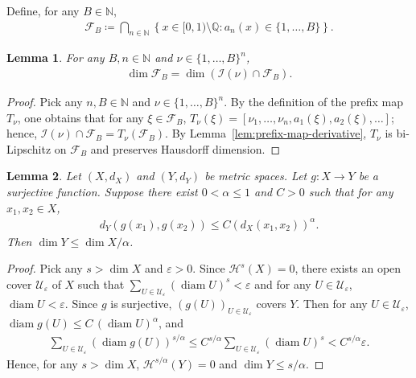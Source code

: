 \documentclass[12pt,reqno]{amsart}
\theoremstyle{definition}
\theoremstyle{plain}
\newtheorem{lemma}{Lemma}
\DeclareMathOperator{\diam}{diam}
\begin{document}
Define, for any $B\in\mathbb{N}$, 
\begin{align*}
    \mathcal{F}_B
    \coloneqq
    \bigcap_{n\in\mathbb{N}}
    \left\{x\in[0,1)\setminus\mathbb{Q}: a_n(x)\in\{1,\ldots,B\}\right\}.
\end{align*}
\begin{lemma}
\label{lem:bounded-prefix-dimension}
For any $B,n\in\mathbb{N}$ and $\nu\in\{1,\dots,B\}^n$,
\begin{align*}
    \dim{\mathcal{F}_B}
    =\dim{\left(\mathcal{I}(\nu)\cap\mathcal{F}_B\right)}.
\end{align*}
\end{lemma}
\begin{proof}
Pick any $n,B\in\mathbb{N}$ and $\nu\in\{1,\dots,B\}^n$. 
By the definition of the prefix map $T_\nu$, one obtains that for any $\xi\in{\mathcal{F}_B}$, $T_\nu(\xi)=[\nu_1,\ldots,\nu_n,a_1(\xi),a_2(\xi),\ldots]$; hence, $\mathcal{I}(\nu)\cap \mathcal{F}_B=T_\nu(\mathcal{F}_B)$. By Lemma~\ref{lem:prefix-map-derivative}, $T_\nu$ is bi-Lipschitz on $\mathcal{F}_B$ and preserves Hausdorff dimension.
\end{proof}

\begin{lemma}
\label{lem:holder-dimension-estimate}
Let $(X,d_X)$ and $(Y,d_Y)$ be metric spaces. Let $g:X\to Y$ be a surjective function. Suppose there exist $0<\alpha\leq 1$ and $C>0$ such that for any $x_1,x_2\in X$,
\begin{align*}
    d_Y(g(x_1),g(x_2))\leq C \left(d_X(x_1,x_2)\right)^\alpha.
\end{align*}
Then $\dim{Y}\leq\dim{X}/\alpha$.
\end{lemma}
\begin{proof}
Pick any $s>\dim{X}$ and $\varepsilon>0$. Since $\mathcal{H}^s(X)=0$, there exists an open cover $\mathcal{U}_{\varepsilon}$ of $X$ such that $\sum_{U\in\mathcal{U}_{\varepsilon}}(\diam{U})^s<\varepsilon$ and for any $U\in\mathcal{U}_{\varepsilon}$, $\diam{U}<\varepsilon$. Since $g$ is surjective, $(g(U))_{U\in\mathcal{U}_{\varepsilon}}$ covers $Y$. Then for any $U\in\mathcal{U}_{\varepsilon}$, $\diam{g(U)}\leq C\,(\diam{U})^\alpha$, and
\begin{align*}
    \sum_{U\in\mathcal{U}_{\varepsilon}}(\diam{g(U)})^{s/\alpha}
    \leq C^{s/\alpha}\sum_{U\in\mathcal{U}_{\varepsilon}} (\diam{U})^s
    < C^{s/\alpha}\varepsilon.
\end{align*}
Hence, for any $s>\dim{X}$, $\mathcal{H}^{s/\alpha}(Y)=0$ and $\dim{Y}\leq s/\alpha$.
\end{proof}
\end{document}
